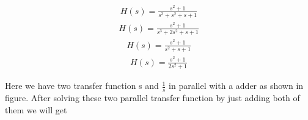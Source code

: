 \begin{enumerate}[label=\thesection.\arabic*.,ref=\thesection.\theenumi]
\begin{figure}
\begin{center}
\begin{tikzpicture}[auto, node distance=2.5cm,>=latex']
        \end{tikzpicture}
    \end{center}
\end{figure}

\begin{align}
 H(s)=\frac{s^2+1}{s^3+s^2+s+1}
\end{align}
\begin{align}
 H(s)=\frac{s^2+1}{s^3+2s^2+s+1}
\end{align}
\begin{align}
 H(s)=\frac{s^2+1}{s^2+s+1}
\end{align}
\begin{align}
 H(s)=\frac{s^2+1}{2s^2+1}
\end{align}



\solution 
Here we have two transfer function s and $\frac{1}{s}$ in parallel with a adder as shown in figure.
After solving these two parallel transfer function by just adding both of them we will get




\end{enumerate}
